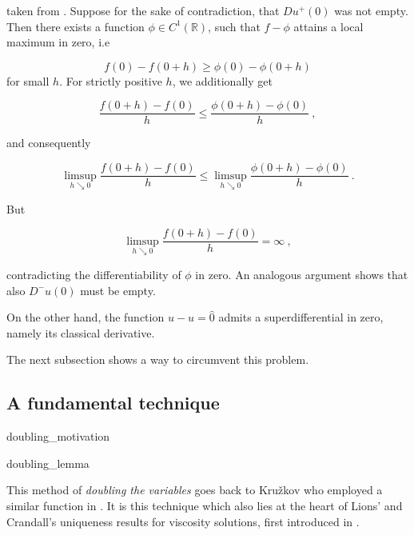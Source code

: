 		taken from \cite[p.~32, exercise 1.5]{bardi2008optimal}. Suppose for the sake of contradiction, that $ Du^{+}(0) $ was not empty. Then there exists a function $ \phi \in C^1(\mathbb{R}) $, such that $ f - \phi $ attains a local maximum in zero, i.e
		
		\begin{equation*}
			f(0) - f(0 + h) \geq \phi(0) - \phi(0 + h) 
		\end{equation*}
		for small $ h $. For strictly positive $ h $, we additionally get
		
		\begin{equation*}
			\frac{f( 0 + h) - f(0)}{h} \leq \frac{\phi(0 + h) - \phi(0)}{h} \ ,
		\end{equation*}
		
		and consequently 
		
		\begin{equation*}
			\limsup\limits_{h \searrow 0} \frac{f( 0 + h) - f(0)}{h} \leq \limsup\limits_{h \searrow 0} \frac{\phi(0 + h) - \phi(0)}{h} \ .
		\end{equation*}
		
		But 
		
		\begin{equation*}
			\limsup\limits_{h \searrow 0} \frac{f( 0 + h) - f(0)}{h} = \infty \ ,
		\end{equation*}
		
		contradicting the differentiability of $ \phi $ in zero. An analogous argument shows that also $ D^{-}u(0) $ must be empty.
		
		On the other hand, the function $ u - u = \hat{0} $ admits a superdifferential in zero, namely its classical derivative.
		
		The next subsection shows a way to circumvent this problem.
		
	\subsection{A fundamental technique}
	
		 {doubling_motivation}
		 
		 {doubling_lemma}
		 
		 This method of \emph{doubling the variables} goes back to Kru\v{z}kov who employed a similar function in \cite{kruvzkov}. It is this technique which also lies at the heart of Lions' and Crandall's uniqueness results for viscosity solutions, first introduced in \cite{lions}.
		 
